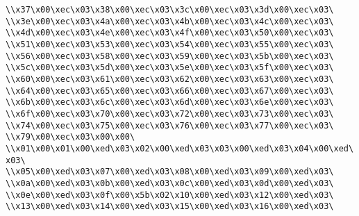 \verb|\\x37\x00\xec\x03\x38\x00\xec\x03\x3c\x00\xec\x03\x3d\x00\xec\x03\|\newline
\verb|\\x3e\x00\xec\x03\x4a\x00\xec\x03\x4b\x00\xec\x03\x4c\x00\xec\x03\|\newline
\verb|\\x4d\x00\xec\x03\x4e\x00\xec\x03\x4f\x00\xec\x03\x50\x00\xec\x03\|\newline
\verb|\\x51\x00\xec\x03\x53\x00\xec\x03\x54\x00\xec\x03\x55\x00\xec\x03\|\newline
\verb|\\x56\x00\xec\x03\x58\x00\xec\x03\x59\x00\xec\x03\x5b\x00\xec\x03\|\newline
\verb|\\x5c\x00\xec\x03\x5d\x00\xec\x03\x5e\x00\xec\x03\x5f\x00\xec\x03\|\newline
\verb|\\x60\x00\xec\x03\x61\x00\xec\x03\x62\x00\xec\x03\x63\x00\xec\x03\|\newline
\verb|\\x64\x00\xec\x03\x65\x00\xec\x03\x66\x00\xec\x03\x67\x00\xec\x03\|\newline
\verb|\\x6b\x00\xec\x03\x6c\x00\xec\x03\x6d\x00\xec\x03\x6e\x00\xec\x03\|\newline
\verb|\\x6f\x00\xec\x03\x70\x00\xec\x03\x72\x00\xec\x03\x73\x00\xec\x03\|\newline
\verb|\\x74\x00\xec\x03\x75\x00\xec\x03\x76\x00\xec\x03\x77\x00\xec\x03\|\newline
\verb|\\x79\x00\xec\x03\x00\x00\|\newline
\verb|\\x01\x00\x01\x00\xed\x03\x02\x00\xed\x03\x03\x00\xed\x03\x04\x00\xed\x03\|\newline
\verb|\\x05\x00\xed\x03\x07\x00\xed\x03\x08\x00\xed\x03\x09\x00\xed\x03\|\newline
\verb|\\x0a\x00\xed\x03\x0b\x00\xed\x03\x0c\x00\xed\x03\x0d\x00\xed\x03\|\newline
\verb|\\x0e\x00\xed\x03\x0f\x00\x5b\x02\x10\x00\xed\x03\x12\x00\xed\x03\|\newline
\verb|\\x13\x00\xed\x03\x14\x00\xed\x03\x15\x00\xed\x03\x16\x00\xed\x03\|\newline
